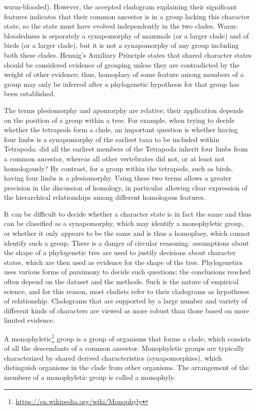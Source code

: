 \documentclass[]{book}
\let\rmarkdownfootnote\footnote%
\def\footnote{\protect\rmarkdownfootnote}
\renewcommand{\href}[2]{#2\footnote{\url{#1}}}
\theoremstyle{definition}
\theoremstyle{definition}
\theoremstyle{definition}
\theoremstyle{remark}
\begin{document}
\begin{enumerate}
\begin{itemize}
  warm-blooded). However, the accepted cladogram explaining their
  significant features indicates that their common ancestor is in a
  group lacking this character state, so the state must have evolved
  independently in the two clades. Warm-bloodedness is separately a
  synapomorphy of mammals (or a larger clade) and of birds (or a larger
  clade), but it is not a synapomorphy of any group including both these
  clades. Hennig's Auxiliary Principle states that shared character
  states should be considered evidence of grouping unless they are
  contradicted by the weight of other evidence; thus, homoplasy of some
  feature among members of a group may only be inferred after a
  phylogenetic hypothesis for that group has been established.
\end{itemize}

The terms plesiomorphy and apomorphy are relative; their application
depends on the position of a group within a tree. For example, when
trying to decide whether the tetrapods form a clade, an important
question is whether having four limbs is a synapomorphy of the earliest
taxa to be included within Tetrapoda: did all the earliest members of
the Tetrapoda inherit four limbs from a common ancestor, whereas all
other vertebrates did not, or at least not homologously? By contrast,
for a group within the tetrapods, such as birds, having four limbs is a
plesiomorphy. Using these two terms allows a greater precision in the
discussion of homology, in particular allowing clear expression of the
hierarchical relationships among different homologous features.

It can be difficult to decide whether a character state is in fact the
same and thus can be classified as a synapomorphy, which may identify a
monophyletic group, or whether it only appears to be the same and is
thus a homoplasy, which cannot identify such a group. There is a danger
of circular reasoning: assumptions about the shape of a phylogenetic
tree are used to justify decisions about character states, which are
then used as evidence for the shape of the tree. Phylogenetics uses
various forms of parsimony to decide such questions; the conclusions
reached often depend on the dataset and the methods. Such is the nature
of empirical science, and for this reason, most cladists refer to their
cladograms as hypotheses of relationship. Cladograms that are supported
by a large number and variety of different kinds of characters are
viewed as more robust than those based on more limited evidence.

A \href{https://en.wikipedia.org/wiki/Monophyly}{monophyletic} group is
a group of organisms that forms a clade, which consists of all the
descendants of a common ancestor. Monophyletic groups are typically
characterized by shared derived characteristics (synapomorphies), which
distinguish organisms in the clade from other organisms. The arrangement
of the members of a monophyletic group is called a monophyly.


\end{enumerate}
\end{document}
